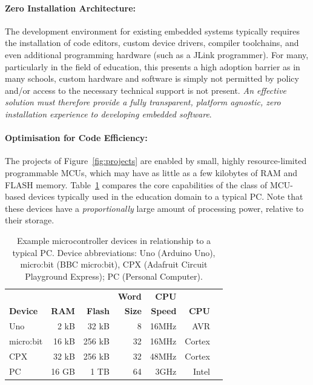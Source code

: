 \paragraph{Zero Installation Architecture:}
The development environment for existing embedded systems typically requires the installation of code editors, custom device drivers, compiler toolchains, and even additional programming hardware (such as a JLink programmer). For many, particularly in the field of education, this presents a high adoption barrier as in many schools, custom hardware and software is simply not permitted by policy and/or access to the necessary technical support is not present. \emph{An effective solution must therefore provide a fully transparent, platform agnostic, zero installation experience to developing embedded software}.

\paragraph{Optimisation for Code Efficiency:}
The projects of Figure~\ref{fig:projects} are enabled by small, highly resource-limited programmable MCUs, which may have as little as a few kilobytes of RAM and FLASH memory.
Table~\ref{table:devices} compares the core capabilities of the class of MCU-based devices typically used in the education domain to a typical PC. Note that these devices have a \emph{proportionally} large amount of processing power, relative to their storage.

\begin{table}[t]
    \centering
    \begin{tabular}{|l|r|r|r|r|r|r|}
    \hline
                           &          &              & \bf{Word}  & \bf{CPU} &            \\
    \bf{Device}            & \bf{RAM} & \bf{Flash}   & \bf{Size}  & \bf{Speed} & \bf{CPU}  \\ \hline
    Uno            & 2 kB       & 32 kB      & 8          & 16MHz & AVR       \\ \hline
    micro:bit          & 16 kB      & 256 kB     & 32         & 16MHz & Cortex     \\ \hline
    CPX           & 32 kB      & 256 kB     & 32         & 48MHz & Cortex    \\ \hline
    PC             & 16 GB      & 1 TB       & 64         & 3GHz & Intel      \\ \hline
    \end{tabular}
    \setlength{\textfloatsep}{-10pt}
    \caption{\label{table:devices}Example microcontroller devices in relationship to a typical PC. Device abbreviations: Uno (Arduino Uno), micro:bit (BBC micro:bit), CPX (Adafruit Circuit Playground Express); PC (Personal Computer).}
    \vspace{-20pt}
\end{table}

